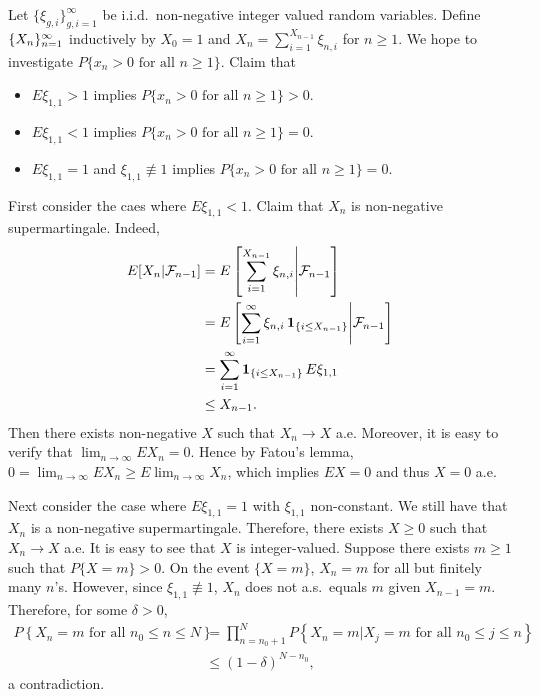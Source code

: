 \documentclass[a4paper]{article}
\begin{document}
\begin{eg}
  \def\tx{\tilde{X}}
  Let $\{ \xi_{g, i} \}_{g, i = 1}^\infty$ be i.i.d.\ non-negative
  integer valued random variables. Define $\{ X_n \}_{n=1}^\infty$ inductively
  by $X_0 = 1$ and $X_n = \sum_{i=1}^{X_{n-1}} \xi_{n, i}$ for $n \geq 1$.
  We hope to investigate $P \{ x_n > 0 \text{ for all $n \geq 1$} \}$.
  Claim that 
  \begin{itemize}
    \item $E \xi_{1, 1} > 1$ implies $P \{ x_n > 0 \text{ for all $n \geq 1$} \} > 0$.
    \item $E \xi_{1, 1} < 1$ implies $P \{ x_n > 0 \text{ for all $n \geq 1$} \} = 0$.
    \item $E \xi_{1, 1} = 1$ and $\xi_{1, 1} \not\equiv 1$ 
    implies $P \{ x_n > 0 \text{ for all $n \geq 1$} \} = 0$.
  \end{itemize}

  First consider the caes where $E \xi_{1, 1} < 1$. Claim that 
  $X_n$ is non-negative supermartingale. Indeed, 
  \begin{align*}
    E [X_n | \mathcal{F}_{n - 1}] 
    &= E \left[ \sum_{i=1}^{X_{n-1}} \xi_{n, i} \middle| \mathcal{F}_{n - 1} \right]  \\
    &= E \left[ \sum_{i=1}^\infty \xi_{n, i} \operatorname{\mathbf{1}}_{\{i \leq X_{n - 1}\}}
    \middle| \mathcal{F}_{n - 1} \right]  \\
    &= \sum_{i=1}^\infty \operatorname{\mathbf{1}}_{\{i \leq X_{n - 1}\}} E \xi_{1, 1} \\
    &\leq X_{n - 1}.
  \end{align*}
  Then there exists non-negative $X$ such that $X_n \to X$ a.e. 
  Moreover, it is easy to verify that $\lim_{n \to \infty} E X_n = 0$.
  Hence by Fatou's lemma, 
  $0 = \lim_{n \to \infty} E X_n \geq E \lim_{n \to \infty} X_n$,
  which implies $E X = 0$ and thus $X = 0$ a.e.

  Next consider the case where $E \xi_{1,1} = 1$ with $\xi_{1,1}$ 
  non-constant. We still have that $X_n$ is a non-negative 
  supermartingale. Therefore, there exists $X \geq 0$ such that 
  $X_n \to X$ a.e. It is easy to see that $X$ is integer-valued. 
  Suppose there exists $m \geq 1$ such that $P \{ X = m \} > 0$.
  On the event $\{ X = m \}$, $X_n = m$ for all but finitely many $n$'s.
  However, since $\xi_{1,1} \not \equiv 1$, $X_n$ does not 
  a.s.\ equals $m$ given $X_{n-1} = m$. Therefore, for 
  some $\delta > 0$,
  \begin{align*}
    P \left\{ X_n = m \text{ for all $n_0 \leq n \leq N$} \right\}
    &= \prod_{n = n_0 + 1}^N P \left\{ X_n = m | X_j = m 
    \text{ for all $n_0 \leq j \leq n$} \right\}  \\
    &\leq (1 - \delta)^{N - n_0},
  \end{align*}
  a contradiction.


\end{eg}
\end{document}
